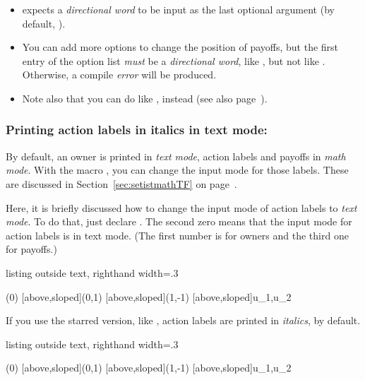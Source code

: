 \remark
\begin{itemize}\tightlist
\item \cmd{\istb} expects a \emph{directional word} to be input as the last optional argument (by default,
\cmd{\istgrowdirection}).
\item You can add more options to change the position of payoffs, but the first entry of the option list \emph{must} be a \emph{directional word}, like \xw{[below,xshift=5mm]}, but not like \xw{[xshift=5mm,below]}.
Otherwise, a compile \emph{error} will be produced.
\item Note also that you can do like \xw{[[xshift=5mm]below}, instead (see also page~\pageref{page:finetuningpayoffs}).
\end{itemize}

\subsubsection{Printing action labels in italics in text mode: \protect\cmd{\setistmathTF*}}
\label{ssec:setistmathTF}

By default, an owner is printed in \emph{text mode}, action labels and payoffs in \emph{math mode}.
With the macro \cmd{\setistmathTF(*)}, you can change the input mode for those labels.
These are discussed in Section~\ref{sec:setistmathTF} on page~\pageref{sec:setistmathTF}.

Here, it is briefly discussed how to change the input mode of action labels to \emph{text mode}.
To do that, just declare . 
The second zero means that the input mode for action labels is in text mode.
(The first number is for owners and the third one for payoffs.)

\begin{tcblisting}{listing outside text, righthand width=.3\linewidth}
\begin{istgame}[font=\footnotesize]
\istroot(0)
  [above,sloped]{(0,1)}
  [above,sloped]{(1,-1)}
  [above,sloped]{u_1,u_2}
  \endist
\end{istgame}
\end{tcblisting}

If you use the starred version, like , action labels are printed in \emph{italics}, by default.

\begin{tcblisting}{listing outside text, righthand width=.3\linewidth}
\begin{istgame}[font=\footnotesize]
\istroot(0)
  [above,sloped]{(0,1)}
  [above,sloped]{(1,-1)}
  [above,sloped]{u_1,u_2}
  \endist
\end{istgame}
\end{tcblisting}

